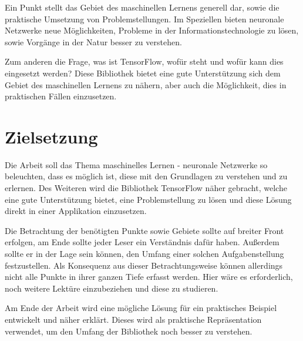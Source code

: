 \noindent
Ein Punkt stellt das Gebiet des maschinellen Lernens generell dar, sowie die praktische Umsetzung von Problemstellungen. 
Im Speziellen bieten neuronale Netzwerke neue Möglichkeiten, Probleme in der Informationstechnologie zu lösen, sowie Vorgänge in der Natur besser zu verstehen. \newline

\noindent
Zum anderen die Frage, was ist TensorFlow, wofür steht und wofür kann dies eingesetzt werden?  
Diese Bibliothek bietet eine gute Unterstützung sich dem Gebiet des maschinellen Lernens zu nähern, aber auch die Möglichkeit, dies in praktischen Fällen einzusetzen. 


\section{Zielsetzung}


Die Arbeit soll das Thema maschinelles Lernen - neuronale Netzwerke so beleuchten, dass es möglich ist, diese mit den Grundlagen zu verstehen und zu erlernen. 
Des Weiteren wird die Bibliothek TensorFlow näher gebracht, welche eine gute Unterstützung bietet, eine Problemstellung zu lösen und diese Lösung direkt in einer Applikation einzusetzen. \newline

\noindent
Die Betrachtung der benötigten Punkte sowie Gebiete sollte auf breiter Front erfolgen, am Ende sollte jeder Leser ein Verständnis dafür haben. 
Außerdem sollte er in der Lage sein können, den Umfang einer solchen Aufgabenstellung festzustellen. 
Als Konsequenz aus dieser Betrachtungsweise können allerdings nicht alle Punkte in ihrer ganzen Tiefe erfasst werden. 
Hier wäre es erforderlich, noch weitere Lektüre einzubeziehen und diese zu studieren. \newline

\noindent
Am Ende der Arbeit wird eine mögliche Lösung für ein praktisches Beispiel entwickelt und näher erklärt.
Dieses wird als praktische Repräsentation verwendet, um den Umfang der Bibliothek noch besser zu verstehen. \newline

